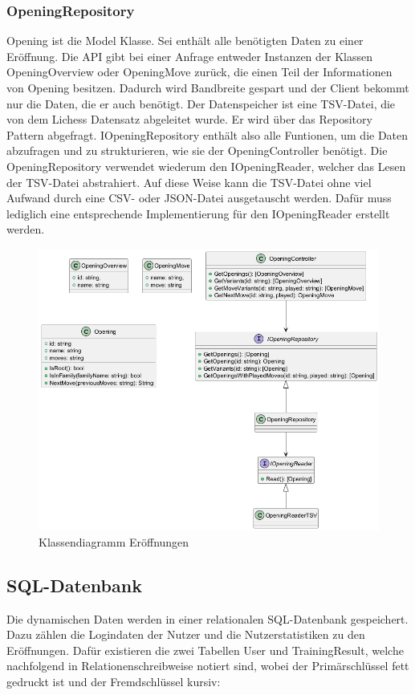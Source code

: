 \subsubsection{OpeningRepository}
Opening ist die Model Klasse. Sei enthält alle benötigten Daten zu einer Eröffnung. Die API gibt bei einer Anfrage entweder Instanzen der Klassen OpeningOverview oder OpeningMove zurück, die einen Teil der Informationen von Opening besitzen. Dadurch wird Bandbreite gespart und der Client bekommt nur die Daten, die er auch benötigt. Der Datenspeicher ist eine TSV-Datei, die von dem Lichess Datensatz abgeleitet wurde. %
Er wird über das Repository Pattern abgefragt. IOpeningRepository enthält also alle Funtionen, um die Daten abzufragen und zu strukturieren, wie sie der OpeningController benötigt. Die OpeningRepository verwendet wiederum den IOpeningReader, welcher das Lesen der TSV-Datei abstrahiert. Auf diese Weise kann die TSV-Datei ohne viel Aufwand durch eine CSV- oder JSON-Datei ausgetauscht werden. Dafür muss lediglich eine entsprechende Implementierung für den IOpeningReader erstellt werden.

\begin{figure}[h]
  \includegraphics[width=\linewidth]{images/diagrams/opening.png}
  \caption{Klassendiagramm Eröffnungen}
  \label{fig:cd_opening}
\end{figure}

\subsection{SQL-Datenbank}
Die dynamischen Daten werden in einer relationalen SQL-Datenbank gespeichert. Dazu zählen die Logindaten der Nutzer und die Nutzerstatistiken zu den Eröffnungen. Dafür existieren die zwei Tabellen User und TrainingResult, welche nachfolgend in Relationenschreibweise notiert sind, wobei der Primärschlüssel fett gedruckt ist und der Fremdschlüssel kursiv:

